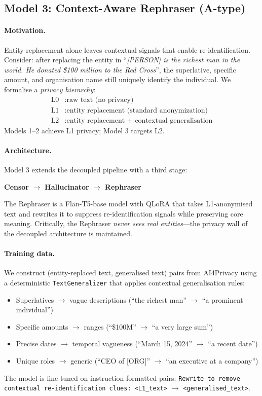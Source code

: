 \documentclass[11pt,a4paper]{article}
\begin{document}
\subsection{Model 3: Context-Aware Rephraser (A-type)}
\label{sec:rephraser}

\paragraph{Motivation.}
Entity replacement alone leaves contextual signals that enable
re-identification.  Consider: after replacing the entity in ``\emph{[PERSON] is
the richest man in the world. He donated \$100 million to the Red Cross}'', the
superlative, specific amount, and organisation name still uniquely identify the
individual.  We formalise a \emph{privacy hierarchy}:
\begin{align}
    \text{L0} &: \text{raw text (no privacy)} \nonumber\\
    \text{L1} &: \text{entity replacement (standard anonymization)} \nonumber\\
    \text{L2} &: \text{entity replacement + contextual generalisation}
\end{align}
Models 1--2 achieve L1 privacy; Model 3 targets L2.

\paragraph{Architecture.}
Model 3 extends the decoupled pipeline with a third stage:
\begin{center}
\small
\textbf{Censor} $\rightarrow$ \textbf{Hallucinator} $\rightarrow$ \textbf{Rephraser}
\end{center}
The Rephraser is a Flan-T5-base model with QLoRA that takes L1-anonymised text
and rewrites it to suppress re-identification signals while preserving core
meaning.  Critically, the Rephraser \emph{never sees real entities}—the privacy
wall of the decoupled architecture is maintained.

\paragraph{Training data.}
We construct (entity-replaced text, generalised text) pairs from AI4Privacy
using a deterministic \texttt{TextGeneralizer} that applies contextual
generalisation rules:
\begin{itemize}
    \item Superlatives $\rightarrow$ vague descriptions (``the richest man''
    $\rightarrow$ ``a prominent individual'')
    \item Specific amounts $\rightarrow$ ranges (``\$100M'' $\rightarrow$
    ``a very large sum'')
    \item Precise dates $\rightarrow$ temporal vagueness (``March 15, 2024''
    $\rightarrow$ ``a recent date'')
    \item Unique roles $\rightarrow$ generic (``CEO of [ORG]'' $\rightarrow$
    ``an executive at a company'')
\end{itemize}
The model is fine-tuned on instruction-formatted pairs:
\texttt{Rewrite to remove contextual re-identification clues: <L1\_text>}
$\rightarrow$ \texttt{<generalised\_text>}.
\end{document}
